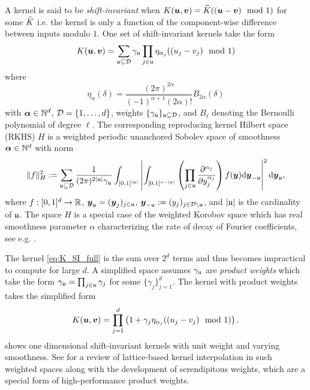\documentclass[acmsmall]{acmart}
\begin{document}
A kernel is said to be \emph{shift-invariant} when $K({\boldsymbol{u}},{\boldsymbol{v}}) = {\widetilde{K}}(({\boldsymbol{u}}-{\boldsymbol{v}}) \mod 1)$ for some ${\widetilde{K}}$ i.e. the kernel is only a function of the component-wise difference between inputs modulo $1$. One set of shift-invariant kernels take the form 
\begin{equation}
    K({\boldsymbol{u}},{\boldsymbol{v}}) = \sum_{{\mathfrak{u}} \subseteq {\mathcal{D}}} \gamma_{\mathfrak{u}} \prod_{j \in {\mathfrak{u}}} \eta_{\alpha_j}((u_j - v_j) \mod 1)
    \label{eq:K_SI_full}
\end{equation}
where 
$$\eta_\alpha(\delta) = \frac{(2\pi)^{2\alpha}}{(-1)^{\alpha+1}(2\alpha)!} B_{2\alpha}(\delta)$$
with ${\boldsymbol{\alpha}} \in {\mathbb{N}}^d$, ${\mathcal{D}} = \{1,\dots,d\}$, weights $\{\gamma_{\mathfrak{u}}\}_{{\mathfrak{u}} \subseteq {\mathcal{D}}}$, and $B_\ell$ denoting the Bernoulli polynomial of degree $\ell$. The corresponding reproducing kernel Hilbert space (RKHS) $H$ is a weighted periodic unanchored Sobolev space of smoothness ${\boldsymbol{\alpha}} \in {\mathbb{N}}^d$ with norm 
$$\lVert f \rVert_H^2 := \sum_{{\mathfrak{u}} \subseteq {\mathcal{D}}} \frac{1}{(2 \pi)^{2 \lvert {\mathfrak{u}} \rvert}\gamma_{\mathfrak{u}}} \int_{[0,1]^{\lvert {\mathfrak{u}} \rvert}} \left\lvert \int_{[0,1]^{s - \lvert {\mathfrak{u}} \rvert}} \left(\prod_{j \in {\mathfrak{u}}} \frac{\partial^{\alpha_j}}{\partial y_j^{\alpha_j}}\right) f({\boldsymbol{y}}) \mathrm{d} {\boldsymbol{y}}_{- {\mathfrak{u}}} \right\rvert^2 \mathrm{d} {\boldsymbol{y}}_{\mathfrak{u}}, $$
where $f:[0,1]^d \to {\mathbb{R}}$, ${\boldsymbol{y}}_{\mathfrak{u}} = ({\boldsymbol{y}}_j)_{j \in {\mathfrak{u}}}$, ${\boldsymbol{y}}_{-{\mathfrak{u}}} := (y_j)_{j \in {\mathcal{D}} \setminus {\mathfrak{u}}}$, and $\lvert {\mathfrak{u}} \rvert$ is the cardinality of ${\mathfrak{u}}$. The space $H$ is a special case of the weighted Korobov space which has real smoothness parameter $\alpha$ characterizing the rate of decay of Fourier coefficients, see e.g. \citep{kaarnioja.kernel_interpolants_lattice_rkhs,kaarnioja.kernel_interpolants_lattice_rkhs_serendipitous,cools2021fast,cools2020lattice,sloan2001tractability,kuo2004lattice}.

The kernel \eqref{eq:K_SI_full} is the sum over $2^d$ terms and thus becomes impractical to compute for large $d$. A simplified space assumes $\gamma_{\mathfrak{u}}$ are \emph{product weights} which take the form $\gamma_{\mathfrak{u}} = \prod_{j \in {\mathfrak{u}}} \gamma_j$ for some $\{\gamma_j\}_{j=1}^d$. The kernel with product weights takes the simplified form 
\begin{equation}
    K({\boldsymbol{u}},{\boldsymbol{v}}) = \prod_{j=1}^d \left(1+\gamma_j \eta_{\alpha_j}((u_j-v_j) \mod 1)\right).
    \label{eq:K_SI_prod}
\end{equation}
 shows one dimensional shift-invariant kernels with unit weight and varying smoothness. See \citep{kaarnioja.kernel_interpolants_lattice_rkhs_serendipitous} for a review of lattice-based kernel interpolation in such weighted spaces along with the development of serendipitous weights, which are a special form of high-performance product weights. 
\end{document}
